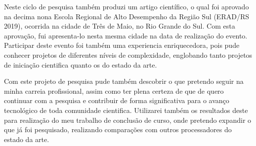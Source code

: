 \documentclass[a4paper,11pt]{article}
\begin{document}
Neste ciclo de pesquisa também produzi um artigo científico, o qual foi aprovado na decima nona Escola Regional de Alto Desempenho da Região Sul (ERAD/RS 2019), ocorrida na cidade de Três de Maio, no Rio Grande do Sul. Com esta aprovação, fui apresenta-lo nesta mesma cidade na data de realização do evento. Participar deste evento foi também uma experiencia enriquecedora, pois pude conhecer projetos de diferentes níveis de complexidade, englobando tanto projetos de iniciação cientifica quanto os do estado da arte.

Com este projeto de pesquisa pude também descobrir o que pretendo seguir na minha carreia profissional, assim como ter plena certeza de que de quero continuar com a pesquisa e contribuir de forma significativa para o avanço tecnológico de toda comunidade cientifica. Utilizarei também os resultados deste para realização do meu trabalho de conclusão de curso, onde pretendo expandir o que já foi pesquisado, realizando comparações com outros processadores do estado da arte.
 
 

\end{document}
